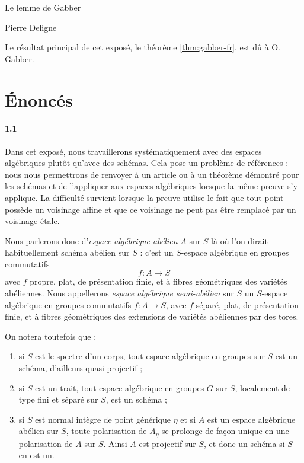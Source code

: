 

\begin{center}
  {\Large Le lemme de Gabber}\par\vspace{0.5em}
  {Pierre Deligne}\par
\end{center}

Le résultat principal de cet exposé, le théorème \ref{thm:gabber-fr}, est dû à O. Gabber.

\section{Énoncés}

\paragraph{1.1}
Dans cet exposé, nous travaillerons systématiquement avec des espaces algébriques plutôt qu'avec des schémas. Cela pose un problème de références : nous nous permettrons de renvoyer à un article ou à un théorème démontré pour les schémas et de l'appliquer aux espaces algébriques lorsque la même preuve s'y applique. La difficulté survient lorsque la preuve utilise le fait que tout point possède un voisinage affine et que ce voisinage ne peut pas être remplacé par un voisinage étale.

Nous parlerons donc d'\emph{espace algébrique abélien} $A$ sur $S$ là où l'on dirait habituellement schéma abélien sur $S$ : c'est un $S$-espace algébrique en groupes commutatifs
\[
  f:A\longrightarrow S
\]
avec $f$ propre, plat, de présentation finie, et à fibres géométriques des variétés abéliennes. Nous appellerons \emph{espace algébrique semi-abélien} sur $S$ un $S$-espace algébrique en groupes commutatifs $f:A\to S$, avec $f$ séparé, plat, de présentation finie, et à fibres géométriques des extensions de variétés abéliennes par des tores.

On notera toutefois que :
\begin{enumerate}[label=(\alph*)]
\item si $S$ est le spectre d'un corps, tout espace algébrique en groupes sur $S$ est un schéma, d'ailleurs quasi-projectif ;
\item si $S$ est un trait, tout espace algébrique en groupes $G$ sur $S$, localement de type fini et séparé sur $S$, est un schéma ;
\item si $S$ est normal intègre de point générique $\eta$ et si $A$ est un espace algébrique abélien sur $S$, toute polarisation de $A_\eta$ se prolonge de façon unique en une polarisation de $A$ sur $S$. Ainsi $A$ est projectif sur $S$, et donc un schéma si $S$ en est un.
\end{enumerate}

